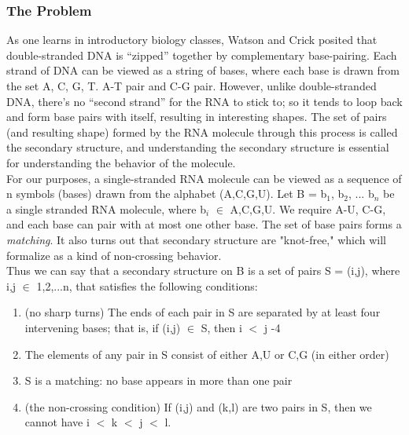 \documentclass{article}
\begin{document}
\subsubsection{The Problem}
As one learns in introductory biology classes, Watson and Crick posited that double-stranded DNA is “zipped” together by complementary base-pairing. Each strand of DNA can be viewed as a string of bases, where each base is drawn from the set {A, C, G, T}. A-T pair and C-G pair. However, unlike double-stranded DNA, there’s no “second strand” for the RNA to stick to; so it tends to loop back and form base pairs with itself, resulting in interesting shapes. The set of pairs (and resulting shape) formed by the RNA molecule through this process is called the secondary structure, and understanding the secondary structure is essential for understanding the behavior of the molecule.\\

For our purposes, a single-stranded RNA molecule can be viewed as a sequence of n symbols (bases) drawn from the alphabet (A,C,G,U). Let B = b$_1$, b$_2$, ... b$_n$ be a single stranded RNA molecule, where b$_i$ $\in$ {A,C,G,U}. We require A-U, C-G, and each base can pair with at most one other base. The set of base pairs forms a \emph{matching}. It also turns out that secondary structure are "knot-free," which will formalize as a kind of non-crossing behavior.\\

Thus we can say that a secondary structure on B is a set of pairs S = {(i,j)}, where i,j $\in$ {1,2,...n}, that satisfies the following conditions:\\

\begin{enumerate}
    \item (no sharp turns) The ends of each pair in S are separated by at least four intervening bases; that is, if (i,j) $\in$ S, then i $<$ j -4
    \item The elements of any pair in S consist of either {A,U} or {C,G} (in either order)
    \item S is a matching: no base appears in more than one pair
    \item (the non-crossing condition) If (i,j) and (k,l) are two pairs in S, then we cannot have i $<$ k $<$ j $<$ l.
\end{enumerate}
\end{document}
